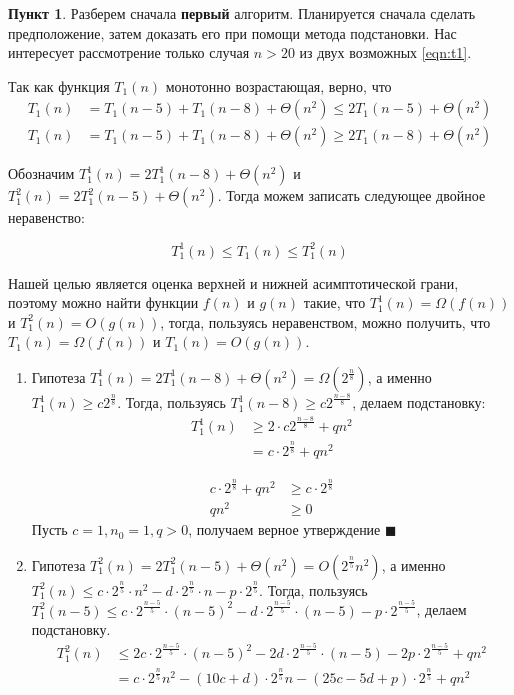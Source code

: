 \documentclass[11pt,a4paper]{scrarticle}
\theoremstyle{definition}
\newtheorem{subtask}{Пункт}
\begin{document}
\begin{subtask}
	Разберем сначала \textbf{первый} алгоритм. Планируется сначала сделать предположение, затем доказать его при помощи метода подстановки. Нас интересует рассмотрение только случая $n > 20$ из двух возможных \eqref{eqn:t1}.

	Так как функция $T_1(n)$ монотонно возрастающая, верно, что
	\begin{align}
		\label{eqn:t1leq} T_1(n) & = T_1(n - 5) + T_1(n - 8) + \Theta(n^2) \leq 2 T_1(n - 5) + \Theta(n^2) \\
		\label{eqn:t1geq} T_1(n) & = T_1(n - 5) + T_1(n - 8) + \Theta(n^2) \geq 2 T_1(n - 8) + \Theta(n^2)
	\end{align}

	Обозначим $T_1^1(n) = 2 T_1^1(n - 8) + \Theta(n^2)$ и $T_1^2(n) = 2 T_1^2(n - 5) + \Theta(n^2)$. Тогда можем записать следующее двойное неравенство:

	$$
		T_1^1(n) \leq T_1(n) \leq T_1^2(n)
	$$

	Нашей целью является оценка верхней и нижней асимптотической грани, поэтому можно найти функции $f(n)$ и $g(n)$ такие, что $T_1^1(n) = \Omega(f(n))$ и $T_1^2(n) = O(g(n))$, тогда, пользуясь неравенством, можно получить, что $T_1(n) = \Omega(f(n))$ и $T_1(n) = O(g(n))$.

	\begin{enumerate}
		\item Гипотеза $T_1^1(n) = 2 T_1^1(n - 8) + \Theta(n^2) = \Omega(2^\frac{n}{8})$, а именно $T_1^1(n) \geq c 2^\frac{n}{8}$.
		      Тогда, пользуясь $T_1^1(n - 8) \geq c 2^\frac{n - 8}{8}$, делаем подстановку:
		      \begin{align*}
			      T_1^1(n) & \geq 2 \cdot c 2^\frac{n - 8}{8} + qn^2 \\
			               & = c \cdot 2^\frac{n}{8} + qn^2
		      \end{align*}

		      \begin{align*}
			      c \cdot 2^\frac{n}{8} + qn^2 & \geq c \cdot 2^\frac{n}{8} \\
			      qn^2                         & \geq 0
		      \end{align*}
		      Пусть $c = 1, n_0 = 1, q > 0$, получаем верное утверждение $\blacksquare$

		\item Гипотеза $T_1^2(n) = 2 T_1^2(n - 5) + \Theta(n^2) = O(2^\frac{n}{5}n^2)$, а именно $T_1^2(n) \leq c \cdot 2^\frac{n}{5} \cdot n^2 - d \cdot 2^\frac{n}{5} \cdot n - p \cdot 2^\frac{n}{5}$.
		      Тогда, пользуясь $T_1^2(n - 5) \leq c \cdot 2^\frac{n - 5}{5} \cdot (n-5)^2 - d \cdot 2^\frac{n - 5}{5} \cdot (n - 5) - p \cdot 2^\frac{n - 5}{5}$, делаем подстановку.
		      \begin{align*}
			      T_1^2(n) & \leq 2 c \cdot 2^\frac{n - 5}{5} \cdot (n-5)^2 - 2 d \cdot 2^\frac{n - 5}{5} \cdot (n - 5) - 2 p \cdot 2^\frac{n - 5}{5} + qn^2 \\
			               & = c \cdot 2^\frac{n}{5} n^2 - (10c + d) \cdot 2^\frac{n}{5} n - (25c - 5d + p) \cdot 2^\frac{n}{5} + qn^2
		      \end{align*}


\end{enumerate}
\end{subtask}
\end{document}
